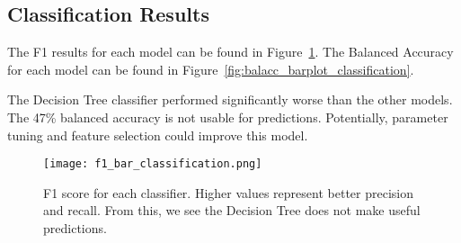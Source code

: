 
\subsection{Classification Results}
\setlength{\parindent}{10ex}
The F1 results for each model can be found in Figure~\ref{fig:f1_barplot_classification}.
The Balanced Accuracy for each model can be found in Figure~\ref{fig:balacc_barplot_classification}.

\par
The Decision Tree classifier performed significantly worse than the other models.
The 47\% balanced accuracy is not usable for predictions.
Potentially, parameter tuning and feature selection could improve this model.


\begin{figure}[htp]
    \centering
    \texttt{[image: f1\_bar\_classification.png]}
    \caption{F1 score for each classifier. Higher values represent better precision and recall. From this, we see the Decision Tree does not make useful predictions.}
    \label{fig:f1_barplot_classification}
\end{figure}

